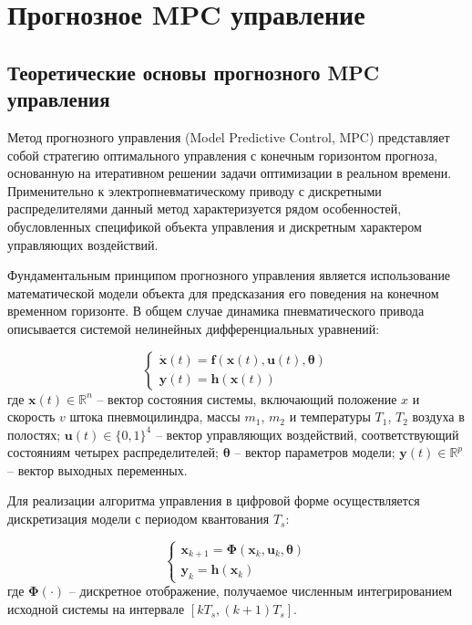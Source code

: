 \section{Прогнозное MPC управление}\label{sec:ch3/sec5}

\subsection{Теоретические основы прогнозного MPC управления}\label{subsec:ch3/sec5/sub1}

Метод прогнозного управления (Model Predictive Control, MPC) представляет собой стратегию
оптимального управления с конечным горизонтом прогноза, основанную на итеративном решении задачи оптимизации в
реальном времени. Применительно к электропневматическому приводу с
дискретными распределителями данный метод характеризуется рядом особенностей, обусловленных
спецификой объекта управления и дискретным характером управляющих воздействий.

Фундаментальным принципом прогнозного управления является использование математической модели
объекта для предсказания его поведения на конечном временном горизонте. В общем случае
динамика пневматического привода описывается системой нелинейных дифференциальных уравнений:

\begin{equation}
	\begin{cases}
		\dot{\mathbf{x}}(t) = \mathbf{f}(\mathbf{x}(t), \mathbf{u}(t), \boldsymbol{\theta}) \\
		\mathbf{y}(t) = \mathbf{h}(\mathbf{x}(t))
	\end{cases}
\end{equation}
где $\mathbf{x}(t) \in \mathbb{R}^n$ -- вектор состояния системы, включающий положение $x$ и скорость $v$ штока пневмоцилиндра, массы $m_1$, $m_2$ и температуры $T_1$, $T_2$ воздуха в полостях;
$\mathbf{u}(t) \in \{0,1\}^4$ -- вектор управляющих воздействий, соответствующий состояниям четырех распределителей;
$\boldsymbol{\theta}$ -- вектор параметров модели;
$\mathbf{y}(t) \in \mathbb{R}^p$ -- вектор выходных переменных.

Для реализации алгоритма управления в цифровой форме осуществляется дискретизация модели с периодом квантования $T_s$:

\begin{equation}
	\begin{cases}
		\mathbf{x}_{k+1} = \boldsymbol{\Phi}(\mathbf{x}_k, \mathbf{u}_k, \boldsymbol{\theta}) \\
		\mathbf{y}_k = \mathbf{h}(\mathbf{x}_k)
	\end{cases}
\end{equation}
где $\boldsymbol{\Phi}(\cdot)$ -- дискретное отображение, получаемое численным интегрированием исходной системы на интервале $[kT_s, (k+1)T_s]$.

